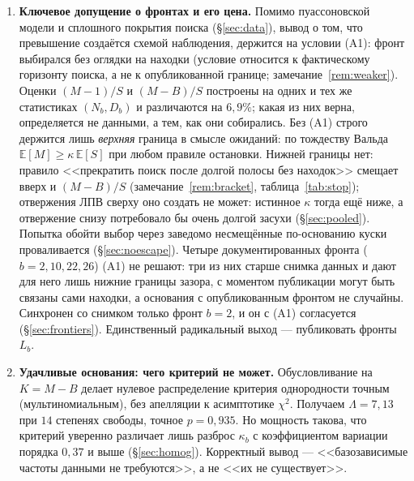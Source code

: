 \documentclass[11pt,a4paper]{article}
\theoremstyle{plain}
\theoremstyle{remark}
\begin{document}
\begin{enumerate}
\item\textbf{Ключевое допущение о фронтах и его цена.} Помимо пуассоновской
модели и сплошного покрытия поиска (\S\ref{sec:data}), вывод о том, что превышение
создаётся схемой наблюдения, держится на условии (A1): фронт выбирался без оглядки
на находки (условие относится к фактическому горизонту поиска, а не к
опубликованной границе; замечание~\ref{rem:weaker}). Оценки
$(M-1)/S$ и $(M-B)/S$ построены на одних и тех же статистиках $(N_b,D_b)$ и
различаются на $6{,}9\%$; какая из них верна, определяется не данными, а тем, как
они собирались. Без (A1) строго держится лишь \emph{верхняя} граница в смысле
ожиданий: по тождеству Вальда $\mathbb E[M]\ge\kappa\,\mathbb E[S]$ при любом
правиле остановки. Нижней границы нет: правило <<прекратить поиск после долгой
полосы без находок>> смещает вверх и $(M-B)/S$ (замечание~\ref{rem:bracket},
таблица~\ref{tab:stop}); отвержения ЛПВ сверху оно создать не может: истинное
$\kappa$ тогда ещё ниже, а отвержение снизу потребовало бы очень долгой засухи
(\S\ref{sec:pooled}). Попытка обойти выбор через заведомо несмещённые по-основанию куски
проваливается (\S\ref{sec:noescape}). Четыре документированных фронта
($b=2,10,22,26$) (A1) не решают: три из них старше снимка данных и дают для него
лишь нижние границы зазора, с моментом публикации могут быть связаны сами
находки, а основания с опубликованным фронтом не случайны. Синхронен со снимком
только фронт $b=2$, и он с (A1) согласуется (\S\ref{sec:frontiers}). Единственный
радикальный выход --- публиковать фронты $L_b$.

\item\textbf{Удачливые основания: чего критерий не может.} Обусловливание на
$K=M-B$ делает нулевое распределение критерия однородности точным
(мультиномиальным), без апелляции к асимптотике $\chi^2$. Получаем
$\Lambda=7{,}13$ при $14$ степенях свободы, точное $p=0{,}935$. Но мощность
такова, что критерий уверенно различает лишь разброс $\kappa_b$ с коэффициентом
вариации порядка $0{,}37$ и выше
(\S\ref{sec:homog}). Корректный вывод --- <<базозависимые частоты данными не
требуются>>, а не <<их не существует>>.


\end{enumerate}
\end{document}
